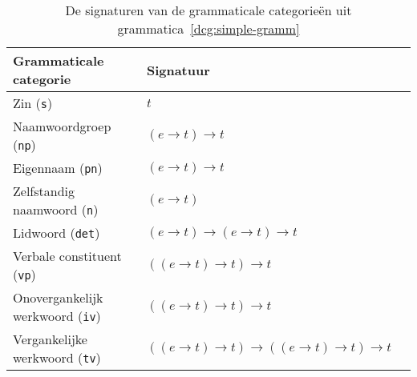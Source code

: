 \begin{table}[h]
  \begin{tabular}{@{}lll}
    \hline
    \textbf{Grammaticale categorie}             & \textbf{Signatuur} \\
    \hline 
    Zin (\texttt{s})                          & $t$ \\
    Naamwoordgroep (\texttt{np})              & $(e \rightarrow t) \rightarrow t$ \\
    Eigennaam (\texttt{pn})                   & $(e \rightarrow t) \rightarrow t$ \\
    Zelfstandig naamwoord (\texttt{n})        & $(e \rightarrow t)$ \\
    Lidwoord (\texttt{det})                   & $(e \rightarrow t) \rightarrow (e \rightarrow t) \rightarrow t$ \\
    Verbale constituent (\texttt{vp})         & $((e \rightarrow t) \rightarrow t) \rightarrow t$ \\
    Onovergankelijk werkwoord (\texttt{iv})   & $((e \rightarrow t) \rightarrow t) \rightarrow t$ \\
    Vergankelijke werkwoord (\texttt{tv})     & $((e \rightarrow t) \rightarrow t) \rightarrow ((e \rightarrow t) \rightarrow t) \rightarrow t$ \\
    \hline
  \end{tabular}
  \centering
  \caption{De signaturen van de grammaticale categorieën uit grammatica~\ref{dcg:simple-gramm}}
  \label{tbl:signaturen}
\end{table}

